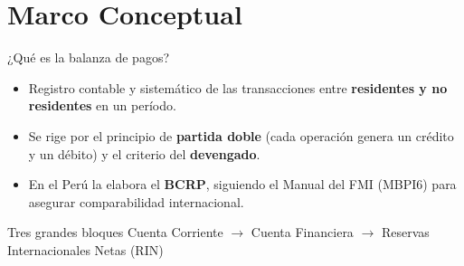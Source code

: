 \documentclass[10pt,aspectratio=169]{beamer}
\begin{document}
\section{Marco Conceptual}
\begin{frame}{¿Qué es la balanza de pagos?}
  \begin{itemize}
    \item Registro contable y sistemático de las transacciones entre \textbf{residentes y no residentes} en un período.
    \item Se rige por el principio de \textbf{partida doble} (cada operación genera un crédito y un débito) y el criterio del \textbf{devengado}.
    \item En el Perú la elabora el \textbf{BCRP}, siguiendo el Manual del FMI (MBPI6) para asegurar comparabilidad internacional.
  \end{itemize}
  \vfill
  \begin{block}{Tres grandes bloques}
    Cuenta Corriente \;$\rightarrow$\; Cuenta Financiera \;$\rightarrow$\; Reservas Internacionales Netas (RIN)
  \end{block}
\end{frame}
\end{document}
